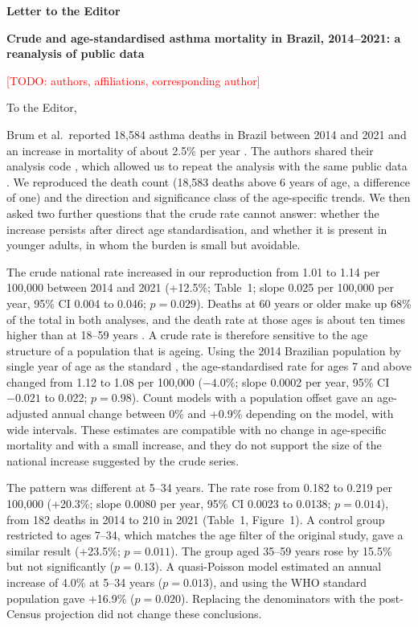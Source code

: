 \documentclass[11pt,a4paper]{article}
\newcommand{\todo}[1]{\textcolor{red}{[TODO: #1]}}
\begin{document}
\noindent\textbf{Letter to the Editor}

\medskip
\noindent\textbf{Crude and age-standardised asthma mortality in Brazil, 2014--2021: a reanalysis of public data}

\medskip
\noindent \todo{authors, affiliations, corresponding author}

\bigskip
\noindent To the Editor,

\medskip
Brum et al.\ reported 18,584 asthma deaths in Brazil between 2014 and 2021 and an increase in mortality of about 2.5\% per year \cite{antunes2024}. The authors shared their analysis code \cite{antunescode}, which allowed us to repeat the analysis with the same public data \cite{sim}. We reproduced the death count (18,583 deaths above 6 years of age, a difference of one) and the direction and significance class of the age-specific trends. We then asked two further questions that the crude rate cannot answer: whether the increase persists after direct age standardisation, and whether it is present in younger adults, in whom the burden is small but avoidable.

The crude national rate increased in our reproduction from 1.01 to 1.14 per 100,000 between 2014 and 2021 (+12.5\%; Table~1; slope 0.025 per 100,000 per year, 95\% CI 0.004 to 0.046; $p=0.029$). Deaths at 60 years or older make up 68\% of the total in both analyses, and the death rate at those ages is about ten times higher than at 18--59 years \cite{antunes2024}. A crude rate is therefore sensitive to the age structure of a population that is ageing. Using the 2014 Brazilian population by single year of age as the standard \cite{ibge2018}, the age-standardised rate for ages 7 and above changed from 1.12 to 1.08 per 100,000 ($-4.0\%$; slope 0.0002 per year, 95\% CI $-0.021$ to 0.022; $p=0.98$). Count models with a population offset gave an age-adjusted annual change between 0\% and +0.9\% depending on the model, with wide intervals. These estimates are compatible with no change in age-specific mortality and with a small increase, and they do not support the size of the national increase suggested by the crude series.

The pattern was different at 5--34 years. The rate rose from 0.182 to 0.219 per 100,000 (+20.3\%; slope 0.0080 per year, 95\% CI 0.0023 to 0.0138; $p=0.014$), from 182 deaths in 2014 to 210 in 2021 (Table~1, Figure~1). A control group restricted to ages 7--34, which matches the age filter of the original study, gave a similar result (+23.5\%; $p=0.011$). The group aged 35--59 years rose by 15.5\% but not significantly ($p=0.13$). A quasi-Poisson model estimated an annual increase of 4.0\% at 5--34 years ($p=0.013$), and using the WHO standard population \cite{ahmad2001} gave +16.9\% ($p=0.020$). Replacing the denominators with the post-Census projection did not change these conclusions.
\end{document}
